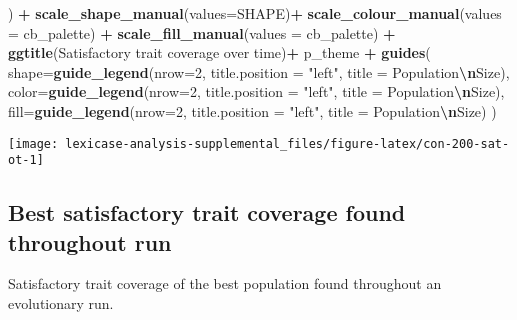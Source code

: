 \documentclass[
]{book}
\newenvironment{Shaded}{\begin{snugshade}}{\end{snugshade}}
\newcommand{\AttributeTok}[1]{\textcolor[rgb]{0.13,0.29,0.53}{#1}}
\newcommand{\DecValTok}[1]{\textcolor[rgb]{0.00,0.00,0.81}{#1}}
\newcommand{\FunctionTok}[1]{\textcolor[rgb]{0.13,0.29,0.53}{\textbf{#1}}}
\newcommand{\NormalTok}[1]{#1}
\newcommand{\SpecialCharTok}[1]{\textcolor[rgb]{0.81,0.36,0.00}{\textbf{#1}}}
\newcommand{\StringTok}[1]{\textcolor[rgb]{0.31,0.60,0.02}{#1}}
\begin{document}
\begin{Shaded}
\begin{Highlighting}[]
\NormalTok{  ) }\SpecialCharTok{+}
  \FunctionTok{scale\_shape\_manual}\NormalTok{(}\AttributeTok{values=}\NormalTok{SHAPE)}\SpecialCharTok{+}
  \FunctionTok{scale\_colour\_manual}\NormalTok{(}\AttributeTok{values =}\NormalTok{ cb\_palette) }\SpecialCharTok{+}
  \FunctionTok{scale\_fill\_manual}\NormalTok{(}\AttributeTok{values =}\NormalTok{ cb\_palette) }\SpecialCharTok{+}
  \FunctionTok{ggtitle}\NormalTok{(}\StringTok{\textquotesingle{}Satisfactory trait coverage over time\textquotesingle{}}\NormalTok{)}\SpecialCharTok{+}
\NormalTok{  p\_theme }\SpecialCharTok{+}
  \FunctionTok{guides}\NormalTok{(}
    \AttributeTok{shape=}\FunctionTok{guide\_legend}\NormalTok{(}\AttributeTok{nrow=}\DecValTok{2}\NormalTok{, }\AttributeTok{title.position =} \StringTok{"left"}\NormalTok{, }\AttributeTok{title =} \StringTok{\textquotesingle{}Population}\SpecialCharTok{\textbackslash{}n}\StringTok{Size\textquotesingle{}}\NormalTok{),}
    \AttributeTok{color=}\FunctionTok{guide\_legend}\NormalTok{(}\AttributeTok{nrow=}\DecValTok{2}\NormalTok{, }\AttributeTok{title.position =} \StringTok{"left"}\NormalTok{, }\AttributeTok{title =} \StringTok{\textquotesingle{}Population}\SpecialCharTok{\textbackslash{}n}\StringTok{Size\textquotesingle{}}\NormalTok{),}
    \AttributeTok{fill=}\FunctionTok{guide\_legend}\NormalTok{(}\AttributeTok{nrow=}\DecValTok{2}\NormalTok{, }\AttributeTok{title.position =} \StringTok{"left"}\NormalTok{, }\AttributeTok{title =} \StringTok{\textquotesingle{}Population}\SpecialCharTok{\textbackslash{}n}\StringTok{Size\textquotesingle{}}\NormalTok{)}
\NormalTok{  )}
\end{Highlighting}
\end{Shaded}

\texttt{[image: lexicase-analysis-supplemental\_files/figure-latex/con-200-sat-ot-1]}

\hypertarget{best-satisfactory-trait-coverage-found-throughout-run-1}{%
\subsection{Best satisfactory trait coverage found throughout run}\label{best-satisfactory-trait-coverage-found-throughout-run-1}}

Satisfactory trait coverage of the best population found throughout an evolutionary run.
\end{document}
